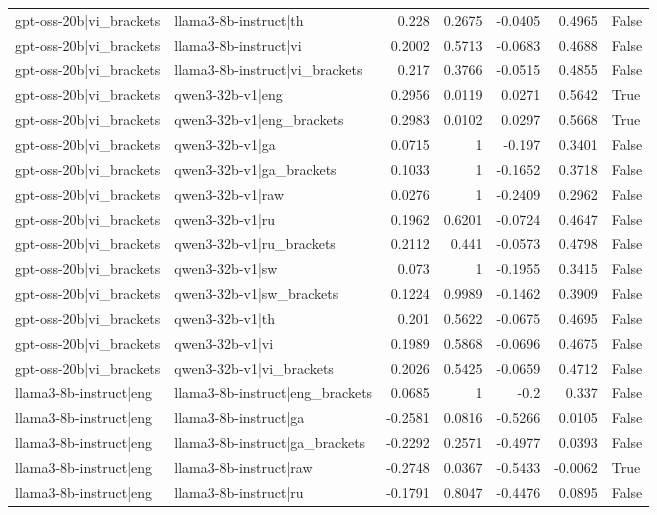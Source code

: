 \begin{table}
\begin{tabular}{l l r r r r l}
gpt-oss-20b|vi_brackets & llama3-8b-instruct|th & 0.228 & 0.2675 & -0.0405 & 0.4965 & False \\
gpt-oss-20b|vi_brackets & llama3-8b-instruct|vi & 0.2002 & 0.5713 & -0.0683 & 0.4688 & False \\
gpt-oss-20b|vi_brackets & llama3-8b-instruct|vi_brackets & 0.217 & 0.3766 & -0.0515 & 0.4855 & False \\
gpt-oss-20b|vi_brackets & qwen3-32b-v1|eng & 0.2956 & 0.0119 & 0.0271 & 0.5642 & True \\
gpt-oss-20b|vi_brackets & qwen3-32b-v1|eng_brackets & 0.2983 & 0.0102 & 0.0297 & 0.5668 & True \\
gpt-oss-20b|vi_brackets & qwen3-32b-v1|ga & 0.0715 & 1 & -0.197 & 0.3401 & False \\
gpt-oss-20b|vi_brackets & qwen3-32b-v1|ga_brackets & 0.1033 & 1 & -0.1652 & 0.3718 & False \\
gpt-oss-20b|vi_brackets & qwen3-32b-v1|raw & 0.0276 & 1 & -0.2409 & 0.2962 & False \\
gpt-oss-20b|vi_brackets & qwen3-32b-v1|ru & 0.1962 & 0.6201 & -0.0724 & 0.4647 & False \\
gpt-oss-20b|vi_brackets & qwen3-32b-v1|ru_brackets & 0.2112 & 0.441 & -0.0573 & 0.4798 & False \\
gpt-oss-20b|vi_brackets & qwen3-32b-v1|sw & 0.073 & 1 & -0.1955 & 0.3415 & False \\
gpt-oss-20b|vi_brackets & qwen3-32b-v1|sw_brackets & 0.1224 & 0.9989 & -0.1462 & 0.3909 & False \\
gpt-oss-20b|vi_brackets & qwen3-32b-v1|th & 0.201 & 0.5622 & -0.0675 & 0.4695 & False \\
gpt-oss-20b|vi_brackets & qwen3-32b-v1|vi & 0.1989 & 0.5868 & -0.0696 & 0.4675 & False \\
gpt-oss-20b|vi_brackets & qwen3-32b-v1|vi_brackets & 0.2026 & 0.5425 & -0.0659 & 0.4712 & False \\
llama3-8b-instruct|eng & llama3-8b-instruct|eng_brackets & 0.0685 & 1 & -0.2 & 0.337 & False \\
llama3-8b-instruct|eng & llama3-8b-instruct|ga & -0.2581 & 0.0816 & -0.5266 & 0.0105 & False \\
llama3-8b-instruct|eng & llama3-8b-instruct|ga_brackets & -0.2292 & 0.2571 & -0.4977 & 0.0393 & False \\
llama3-8b-instruct|eng & llama3-8b-instruct|raw & -0.2748 & 0.0367 & -0.5433 & -0.0062 & True \\
llama3-8b-instruct|eng & llama3-8b-instruct|ru & -0.1791 & 0.8047 & -0.4476 & 0.0895 & False \\

\end{tabular}
\end{table}
